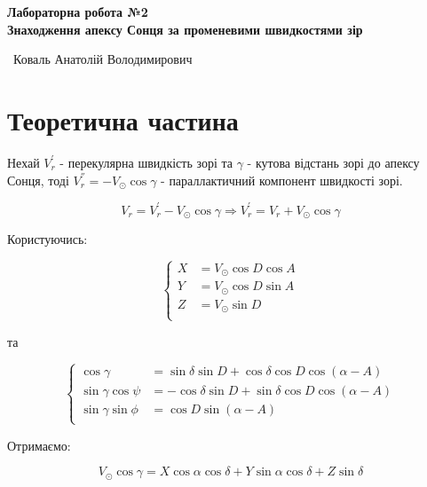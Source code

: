 \documentclass[12pt]{article}
\begin{document}
\fontsize{14}{14}\selectfont
\newpage

{\center \LARGE {\bf Лабораторна робота №2} \\}
{\center \large {\bf Знаходження апексу Сонця за променевими швидкостями зір} \\}

\begin{center}\
  Коваль Анатолій Володимирович \\
\end{center}

\section*{Теоретична частина}
  Нехай $V_r^{'}$ - перекулярна швидкість зорі та $\gamma$ - кутова відстань зорі до апексу Сонця, тоді $V_r^{''}=-V_{\odot}\cos\gamma$ - параллактичний компонент швидкості зорі.

  \begin{equation}
    V_r = V_r^{'}-V_{\odot}\cos\gamma \Rightarrow V_r^{'} = V_r+V_{\odot}\cos\gamma
  \end{equation}

  Користуючись:

  \begin{equation}
    \begin{cases}
      X &= V_{\odot}\cos D\cos A \\
      Y &= V_{\odot}\cos D\sin A \\
      Z &= V_{\odot}\sin D \\
    \end{cases}
  \end{equation}

  та

  \begin{equation}
    \begin{cases}
      \cos\gamma &= \sin\delta\sin D + \cos\delta\cos D\cos(\alpha - A) \\
      \sin\gamma\cos\psi &= -\cos\delta\sin D + \sin\delta\cos D\cos(\alpha -A) \\
      \sin\gamma\sin\phi &= \cos D\sin(\alpha - A) \\
    \end{cases}
  \end{equation}

  Отримаємо:

  \begin{equation}
    V_{\odot}\cos\gamma = X\cos\alpha\cos\delta + Y\sin\alpha\cos\delta + Z\sin\delta
  \end{equation}
\end{document}
